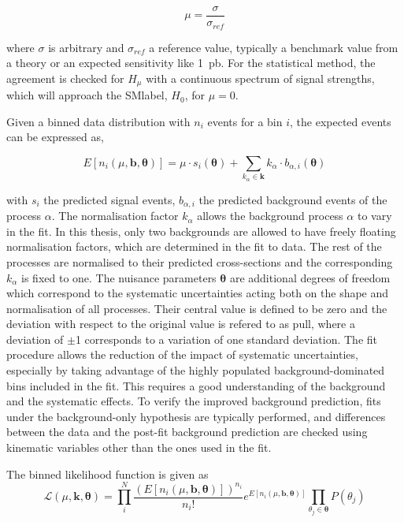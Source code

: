 \begin{equation}
    \mu = \frac{\sigma}{\sigma_{ref}}
\end{equation}

where $\sigma$ is arbitrary and $\sigma_{ref}$ a reference value, typically a benchmark value from a theory or an expected sensitivity like 1~pb. For the statistical method, the agreement is checked for $H_\mu$ with a continuous spectrum of signal strengths, which will approach the \acrshort{SMlabel}, $H_0$, for $\mu=0$.

Given a binned data distribution with $n_i$ events for a bin $i$, the expected events can be expressed as,

\begin{equation}
    E[n_i(\mu,\mathbf{b},\boldsymbol{\theta})] = \mu\cdot s_i(\boldsymbol{\theta}) + \sum_{k_{\alpha}\in\mathbf{k}}k_\alpha\cdot b_{\alpha,i}(\boldsymbol{\theta})
\end{equation}

with $s_i$ the predicted signal events, $b_{\alpha,i}$ the predicted background events of the process $\alpha$. The normalisation factor $k_\alpha$ allows the background process $\alpha$ to vary in the fit. In this thesis, only two backgrounds are allowed to have freely floating normalisation factors, which are determined in the fit to data. The rest of the processes are normalised to their predicted cross-sections and the corresponding $k_\alpha$ is fixed to one. The nuisance parameters $\boldsymbol{\theta}$ are additional degrees of freedom which correspond to the systematic uncertainties acting both on the shape and normalisation of all processes. Their central value is defined to be zero and the deviation with respect to the original value is refered to as pull, where a deviation of $\pm$1 corresponds to a variation of one standard deviation. The fit procedure allows the reduction of the impact of systematic uncertainties, especially by taking advantage of the highly populated background-dominated bins included in the fit. This requires a good understanding of the background and the systematic effects. To verify the improved background prediction, fits under the background-only hypothesis are typically performed, and differences between the data and the post-fit background prediction are checked using kinematic variables other than the ones used in the fit.

The binned likelihood function is given as
\begin{equation}
    \mathscr{L}(\mu,\mathbf{k},\boldsymbol{\theta}) = \prod_i^N \frac{ (E[n_i(\mu,\mathbf{b},\boldsymbol{\theta})])^{n_i}}{n_i!}e^{E[n_i(\mu,\mathbf{b},\boldsymbol{\theta})]}\prod_{\theta_j\in\boldsymbol{\theta}}P(\theta_j)
\end{equation}

